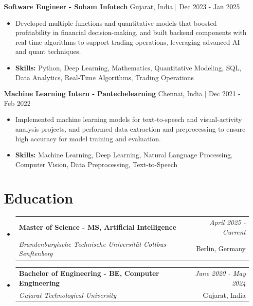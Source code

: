 \documentclass[a4paper,11pt]{article}
\makeatletter
\newcommand{\resumeSubheading}[4]{
\vspace{0.5mm}\item
    \begin{tabular*}{\linewidth}[t]{l@{\extracolsep{\fill}}r}
        \textbf{#1} & \textit{\footnotesize{#4}} \\
        \textit{\footnotesize{#3}} &  \footnotesize{#2}\\
    \end{tabular*}
    \vspace{-2.4mm}
}
\makeatother
\begin{document}
\vspace{1mm}
  \textbf{Software Engineer - Soham Infotech} \hfill Gujarat, India | Dec 2023 - Jan 2025
\vspace{-1.5mm} %
\begin{itemize}
  \item Developed multiple functions and quantitative models that boosted profitability in financial decision-making, and built backend components with real-time algorithms to support trading operations, leveraging advanced AI and quant techniques.

\vspace{-2mm}
  \item \textbf{Skills:} Python, Deep Learning, Mathematics, Quantitative Modeling, SQL, Data Analytics, Real-Time Algorithms, Trading Operations
\end{itemize}

\vspace{1mm}
  \textbf{Machine Learning Intern - Pantechelearning} \hfill Chennai, India | Dec 2021 - Feb 2022
\vspace{-1.5mm} %
\begin{itemize}
  \item Implemented machine learning models for text-to-speech and visual-activity analysis projects, and performed data extraction and preprocessing to ensure high accuracy for model training and evaluation.
\vspace{-2mm}
  \item \textbf{Skills:} Machine Learning, Deep Learning, Natural Language Processing, Computer Vision, Data Preprocessing, Text-to-Speech
\end{itemize}\section{\textbf{Education}}
\vspace{-0.4mm}

\begin{itemize}[leftmargin=0.15in, label={}]
\resumeSubheading
{Master of Science - MS, Artificial Intelligence }{Berlin, Germany}
{Brandenburgische Technische Universität Cottbus-Senftenberg  }{April 2025 - Current}

\vspace{1.0mm} %
\resumeSubheading
{Bachelor of Engineering - BE, Computer Engineering  }{Gujarat, India}
{Gujarat Technological University }{June 2020 - May 2024}

\end{itemize}
\end{document}

